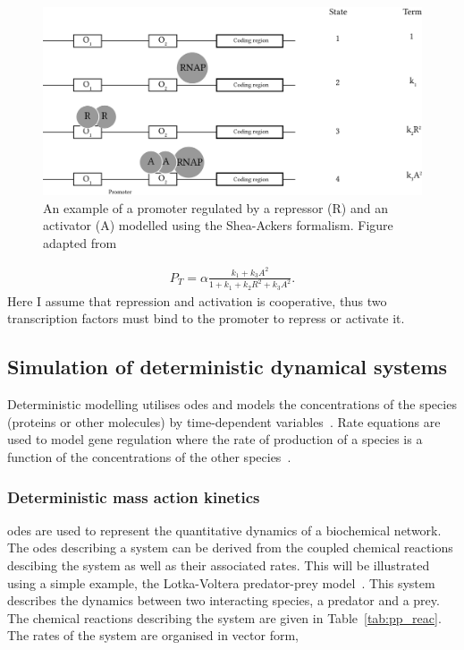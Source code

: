 \begin{figure}[htb]
\centerfloat
    \includegraphics[scale=0.8]{../../chapters/chapterBackgr/images/shea-ackers.png}
    \caption[Shea-Ackers formalism example]{An example of a promoter regulated by a repressor (R) and an activator (A) modelled using the Shea-Ackers formalism. Figure adapted from~\textcite{Woods:2016eh}}
    \label{fig:shea_ack_ex}
\end{figure}


\begin{align}
	P_{T} = \alpha \frac{k_1 + k_{3}A^2}{1 + k_1 + k_{2}R^2 + k_{3}A^2}.
\end{align}
Here I assume that repression and activation is cooperative, thus two transcription factors must bind to the promoter to repress or activate it. 
\newpage
\subsection{Simulation of deterministic dynamical systems}
Deterministic modelling utilises \acrshort{ode}s and models the concentrations of the species (proteins or other molecules) by time-dependent variables~\autocite{deJong:2002ft}. Rate equations are used to model gene regulation where the rate of production of a species is a function of the concentrations of the other species~\autocite{deJong:2002ft}. 

\subsubsection{Deterministic mass action kinetics}
\label{sec:predator_prey_odes}
\acrshort{ode}s are used to represent the quantitative dynamics of a biochemical network. The \acrshort{ode}s describing a system can be derived from the coupled chemical reactions descibing the system as well as their associated rates. This will be illustrated using a simple example, the Lotka-Voltera predator-prey model~\autocite{lotka:voltera}. This system describes the dynamics between two interacting species, a predator and a prey. The chemical reactions describing the system are given in Table~\ref{tab:pp_reac}. The rates of the system are organised in vector form,


